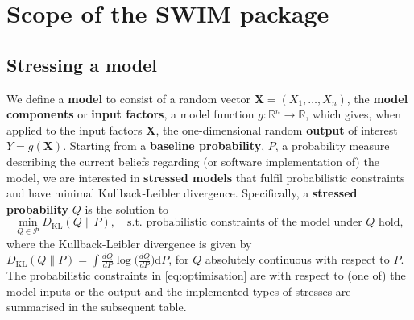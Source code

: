 \documentclass[]{article}
\title{}
\author{}
\date{}
\theoremstyle{definition}
\theoremstyle{definition}
\theoremstyle{definition}
\theoremstyle{remark}
\begin{document}
{
\setcounter{tocdepth}{2}
\tableofcontents
}
\hypertarget{scope-of-the-swim-package}{%
\section{Scope of the SWIM package}\label{scope-of-the-swim-package}}

\hypertarget{Rfunctions}{%
\subsection{Stressing a model}\label{Rfunctions}}

We define a \textbf{model} to consist of a random vector \(\boldsymbol{X} = (X_1, \ldots, X_n)\), the \textbf{model components} or \textbf{input factors}, a model function \(g \colon \mathbb{R}^n \to \mathbb{R}\), which gives, when applied to the input factors \(\boldsymbol{X}\), the one-dimensional random \textbf{output} of interest \(Y = g(\boldsymbol{X})\). Starting from a \textbf{baseline probability}, \(P\), a probability measure describing the current beliefs regarding (or software implementation of) the model, we are interested in \textbf{stressed models} that fulfil probabilistic constraints and have minimal Kullback-Leibler divergence. Specifically, a \textbf{stressed probability} \(Q\) is the solution to
\begin{equation} 
\min_{ Q \in \mathcal{P}} D_\text{KL}(Q \| P), \quad
\text{s.t. probabilistic constraints of the model under }Q \text{ hold},
\label{eq:optimisation}
\end{equation}
where the Kullback-Leibler divergence is given by \(D_\text{KL}(Q \| P) = \int \frac{dQ}{dP} \log \big(\frac{dQ}{dP} \big)\mathrm{d}P\), for \(Q\) absolutely continuous with respect to \(P\). The probabilistic constraints in \eqref{eq:optimisation} are with respect to (one of) the model inputs or the output and the implemented types of stresses are summarised in the subsequent table.
\end{document}
